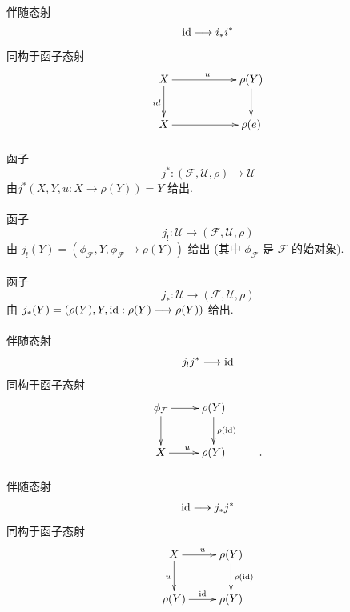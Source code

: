 \paragraph{}
伴随态射
$$
\operatorname{id}\longrightarrow i_{\ast}i^{\ast}
$$
同构于函子态射
\[
\xymatrix@C=2cm{
X \ar[r]^{u} \ar[d]_{id}& \rho(Y) \ar[d]\\
X \ar[r]                & \rho(e) }
\]

\paragraph{}
函子\pageoriginale
$$
j^{\ast}:(\mathcal{F},\mathcal{U},\rho)\longrightarrow\mathcal{U}
$$
由\qquad $j^{\ast}(X,Y,u:X\longrightarrow\rho(Y))=Y$ 给出.

\paragraph{}
函子
$$
j_{!}:\mathcal{U}\longrightarrow(\mathcal{F},\mathcal{U},\rho)
$$
由\qquad
$j_{!}(Y)=(\phi_{\mathcal{F}},Y,
\phi_{\mathcal{F}}\longrightarrow\rho(Y))$
给出
\noindent (其中 $\phi_{\mathcal{F}}$ 是 $\mathcal{F}$ 的始对象).

\paragraph{}
函子
$$
j_{\ast}:\mathcal{U}\longrightarrow(\mathcal{F},\mathcal{U},\rho)
$$
由\qquad
$j_{\ast}(Y)=(\rho(Y),Y,\operatorname{id}:\rho(Y)\longrightarrow\rho(Y))$ 给出.

\paragraph{}
伴随态射
$$
j_{!}j^{\ast}\longrightarrow\operatorname{id}
$$
同构于函子态射
\[
\xymatrix{
\phi_{\Ff} \ar[r] \ar[d] & \rho(Y) \ar[d]^{\rho(\id)}\\
X \ar[r]^{u}                 & \rho(Y)     &. }
\]

\paragraph{}
伴随态射
$$
\operatorname{id}\longrightarrow j_{\ast}j^{\ast}
$$
同构于函子态射
\[
\xymatrix{
X  \ar[r]^{u} \ar[d]_{u}& \rho(Y) \ar[d]^{\rho(\id)}\\
\rho(Y) \ar[r]^{\id}& \rho(Y) }
\]

